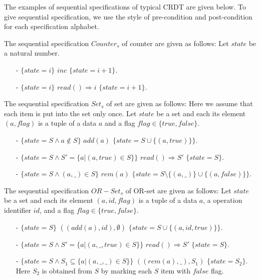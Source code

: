 The examples of sequential specifications of typical CRDT are given below. To give sequential specification, we use the style of pre-condition and post-condition for each specification alphabet.


\begin{example}[Counter]
\label{definition:sequential specification of counter}
The sequential specification $\mathit{Counter}_s$ of counter are given as follows: Let $state$ be a natural number.

\begin{itemize}
\setlength{\itemsep}{0.5pt}
\item[-] $\{ state = i \}$ $inc$ $\{ state = i+1 \}$.
\item[-] $\{ state = i \}$ $read() \Rightarrow i$ $\{ state = i+1 \}$.
\end{itemize}
\end{example}


\begin{example}[Set]
\label{definition:sequential specification of set}
The sequential specification $\mathit{Set}_s$ of set are given as follows: Here we assume that each item is put into the set only once. Let $state$ be a set and each its element $(a,flag)$ is a tuple of a data $a$ and a flag $flag \in \{ \mathit{true},\mathit{false} \}$.

\begin{itemize}
\setlength{\itemsep}{0.5pt}
\item[-] $\{ state = S \wedge a \notin S \}$ $add(a)$ $\{ state = S \cup \{ (a,\mathit{true}) \} \}$.
\item[-] $\{ state = S \wedge S' = \{a \vert (a,\mathit{true}) \in S \} \}$ $read() \Rightarrow S'$ $\{ state = S \}$.
\item[-] $\{ state = S \wedge (a,\_) \in S \}$ $rem(a)$ $\{ state = S \setminus \{ (a,\_) \} \cup \{ (a,\mathit{false}) \} \}$.
\end{itemize}
\end{example}



\begin{example}[OR-Set]
\label{definition:sequential specification of or-set}
The sequential specification $\mathit{OR-Set}_s$ of OR-set are given as follows: Let $state$ be a set and each its element $(a,id,flag)$ is a tuple of a data $a$, a operation identifier $id$, and a flag $flag \in \{ \mathit{true},\mathit{false} \}$.
\begin{itemize}
\setlength{\itemsep}{0.5pt}
\item[-] $\{ state = S  \}$ $((add(a),\mathit{id}),\emptyset)$ $\{ state = S \cup \{ (a,\mathit{id},\mathit{true}) \} \}$.
\item[-] $\{ state = S \wedge S' = \{ a \vert (a,\_,\mathit{true}) \in S \} \}$ $read() \Rightarrow S'$ $\{ state = S \}$.
\item[-] $\{ state = S  \wedge S_1 \subseteq \{a \vert (a,\_,\_) \in S\} \}$ $((rem(a),\_),S_1)$ $\{ state = S_2  \}$. Here $S_2$ is obtained from $S$ by marking each $S$ item with $\mathit{false}$ flag.
\end{itemize}
\end{example}


